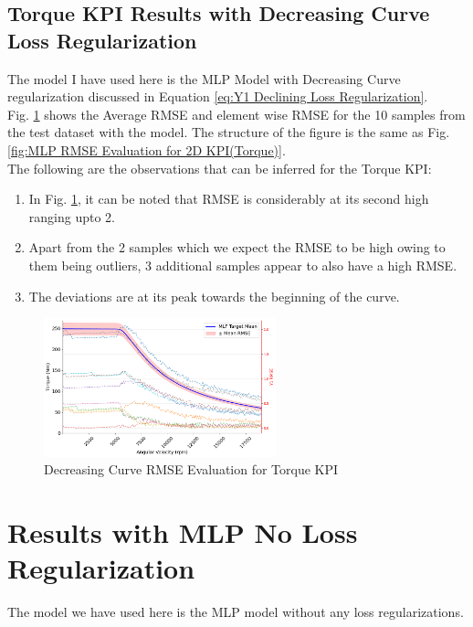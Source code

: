 \documentclass{report} %
\begin{document}
\subsection{Torque KPI Results with Decreasing Curve Loss Regularization}\label{subsec:KPI Results with Decreasing curve Loss Regularization}
The model I have used here is the \ac{MLP} Model with Decreasing Curve regularization discussed in Equation \ref{eq:Y1 Declining Loss Regularization}.\\
Fig. \ref{fig:Decreasing Torque RMSE Evaluation for 2D KPI(Torque)} shows the Average \ac{RMSE} and element wise \ac{RMSE} for the 10 samples from the test dataset 
with the model. The structure of the figure is the same as Fig. \ref{fig:MLP RMSE Evaluation for 2D KPI(Torque)}.\\

The following are the observations that can be inferred for the Torque \ac{KPI}:
\begin{enumerate}[nosep]
    \item In Fig. \ref{fig:Decreasing Torque RMSE Evaluation for 2D KPI(Torque)}, it can be noted that \ac{RMSE} is considerably at its second high 
    ranging upto 2.
    \item Apart from the 2 samples which we expect the \ac{RMSE} to be high owing to them being outliers, 3 additional samples appear to also have a high \ac{RMSE}.
    \item The deviations are at its peak towards the beginning of the curve.
\end{enumerate}

\begin{figure}[H]
    \centering
    \includegraphics[width=0.6\textwidth]{./ReportImages/RMSE_MLP_Decreasing_y1.png} 
    \caption{Decreasing Curve \ac{RMSE} Evaluation for Torque \ac{KPI}} 
    \label{fig:Decreasing Torque RMSE Evaluation for 2D KPI(Torque)}
\end{figure}

\section{Results with MLP No Loss Regularization}\label{sec:Results with No Loss Regularization}
The model we have used here is the \ac{MLP} model without any loss regularizations.
\end{document}
